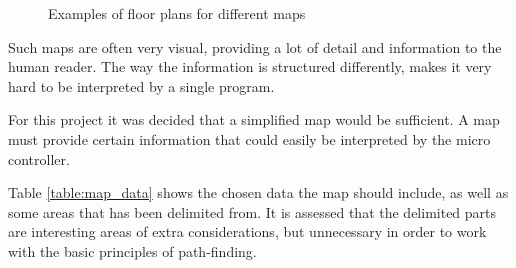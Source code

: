 \begin{figure}[htp]
    \centering
    \caption{Examples of floor plans for different maps}
    \hfill%
    \label{fig:floor_plans}
\end{figure}

Such maps are often very visual, providing a lot of detail and information to the human reader.
The way the information is structured differently, makes it very hard to be interpreted by a single program.

For this project it was decided that a simplified map would be sufficient.
A map must provide certain information that could easily be interpreted by the micro controller.

Table \ref{table:map_data} shows the chosen data the map should include, as well as some areas that has been delimited from. 
It is assessed that the delimited parts are interesting areas of extra considerations, 
but unnecessary in order to work with the basic principles of path-finding.

